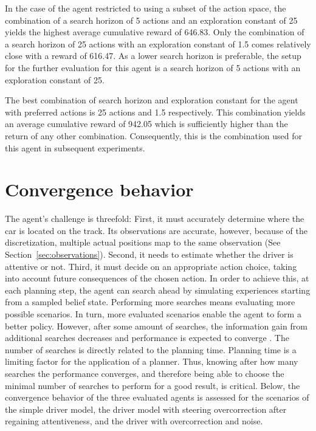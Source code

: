 In the case of the agent restricted to using a subset of the action space, the combination of a search horizon of 5 actions and an exploration constant of 25 yields the highest average cumulative reward of 646.83. Only the combination of a search horizon of 25 actions with an exploration constant of 1.5 comes relatively close with a reward of 616.47. As a lower search horizon is preferable, the setup for the further evaluation for this agent is a search horizon of 5 actions with an exploration constant of 25. 

The best combination of search horizon and exploration constant for the agent with preferred actions is 25 actions and 1.5 respectively. This combination yields an average cumulative reward of 942.05 which is sufficiently higher than the return of any other combination. Consequently, this is the combination used for this agent in subsequent experiments.

\section{Convergence behavior}
\label{sec:convergence}




The agent's challenge is threefold: First, it must accurately determine where the car is located on the track. Its observations are accurate, however, because of the discretization, multiple actual positions map to the same observation (See Section~\ref{sec:observations}). Second, it needs to estimate whether the driver is attentive or not. Third, it must decide on an appropriate action choice, taking into account future consequences of the chosen action. In order to achieve this, at each planning step, the agent can search ahead by simulating experiences starting from a sampled belief state. Performing more searches means evaluating more possible scenarios. In turn, more evaluated scenarios enable the agent to form a better policy. However, after some amount of searches, the information gain from additional searches decreases and performance is expected to converge \parencite{pomcp}. The number of searches is directly related to the planning time. Planning time is a limiting factor for the application of a planner. Thus, knowing after how many searches the performance converges, and therefore being able to choose the minimal number of searches to perform for a good result, is critical. Below, the convergence behavior of the three evaluated agents is assessed for the scenarios of the simple driver model, the driver model with steering overcorrection after regaining attentiveness, and the driver with overcorrection and noise.

